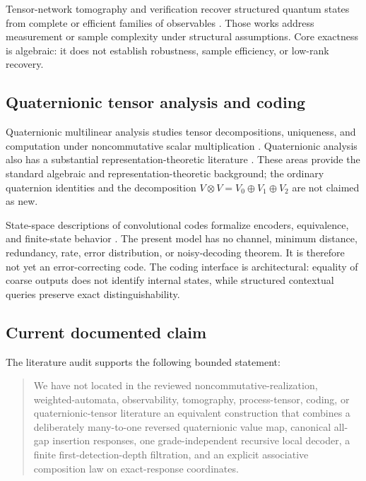\documentclass[11pt]{article}
\theoremstyle{definition}
\theoremstyle{remark}
\begin{document}
Tensor-network tomography and verification recover structured quantum states from complete or efficient families of observables \cite{cruz2021,lidiak2022}.  Those works address measurement or sample complexity under structural assumptions.  Core exactness is algebraic: it does not establish robustness, sample efficiency, or low-rank recovery.

\subsection{Quaternionic tensor analysis and coding}

Quaternionic multilinear analysis studies tensor decompositions, uniqueness, and computation under noncommutative scalar multiplication \cite{flamant2024}.  Quaternionic analysis also has a substantial representation-theoretic literature \cite{frenkel2007,frenkel2019}.  These areas provide the standard algebraic and representation-theoretic background; the ordinary quaternion identities and the decomposition $V\otimes V=V_0\oplus V_1\oplus V_2$ are not claimed as new.

State-space descriptions of convolutional codes formalize encoders, equivalence, and finite-state behavior \cite{gluesing2006,holub2017}.  The present model has no channel, minimum distance, redundancy, rate, error distribution, or noisy-decoding theorem.  It is therefore not yet an error-correcting code.  The coding interface is architectural: equality of coarse outputs does not identify internal states, while structured contextual queries preserve exact distinguishability.

\subsection{Current documented claim}

The literature audit supports the following bounded statement:

\begin{quote}
We have not located in the reviewed noncommutative-realization, weighted-automata, observability, tomography, process-tensor, coding, or quaternionic-tensor literature an equivalent construction that combines a deliberately many-to-one reversed quaternionic value map, canonical all-gap insertion responses, one grade-independent recursive local decoder, a finite first-detection-depth filtration, and an explicit associative composition law on exact-response coordinates.
\end{quote}
\end{document}
